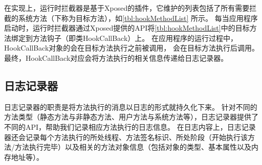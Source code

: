 \begin{table*}[!ht]
{\begin{threeparttable}[b]
\begin{tabular}{|l|c|}
				
				
				
			\end{tabular}
			
			
		\end{threeparttable}
	}
\end{table*}


在实现上，运行时拦截器是基于Xposed的插件，它维护的列表包括了所有需要拦截的系统方法（下称为目标方法），如\autoref{tbl:hookMethodList} 所示。
每当应用程序启动时，运行时拦截器通过Xposed提供的API将\autoref{tbl:hookMethodList}中的目标方法绑定到方法钩子（即类HookCallBack）上。
在应用程序的运行过程中，HookCallBack对象的会在目标方法执行之前被调用，
会在目标方法执行后调用。
最终，HookCallBack对应会将方法执行的相关信息传递给日志记录器。









\subsection{日志记录器}

日志记录器的职责是将方法执行的消息以日志的形式就持久化下来。
针对不同的方法类型（静态方法与非静态方法、用户方法与系统方法等），日志记录器提供了不同的API，帮助我们记录相应方法执行的日志信息。
在日志内容上，日志记录器还会记录每个方法执行的所处线程、方法签名标识、所处阶段（开始执行该方法/方法执行完毕）以及相关的方法对象信息（包括对象的类型、基本属性以及内存地址等）。


